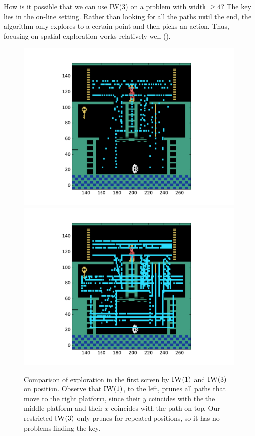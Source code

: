 How is it possible that we can use \ac{IW}(3) on a problem with width $\geq 4$?
The key lies in the on-line setting. Rather than looking for all the paths until
the end, the algorithm only explores to a certain point and then picks an
action. Thus, focusing on spatial exploration works relatively well
().
\begin{figure}[hbtp]
\begin{center}
\includegraphics[width=\textwidth / 2 -2cm]{img/iw1-explore-thick.pdf}
\includegraphics[width=\textwidth / 2 -2cm]{img/iw3-explore-thick.pdf}
\end{center}
\caption[Comparison of exploration in the first screen by $\textsc{IW}(1)$ and
$\textsc{IW}(3)$ on position.]
{Comparison of exploration in the first screen by $\textsc{IW}(1)$ and
$\textsc{IW}(3)$ on position. Observe that $\textsc{IW}(1)$, to the left, prunes
all paths that move to the right platform, since their $y$ coincides with the
the middle platform and their $x$ coincides with the path on top.
Our restricted $\textsc{IW}(3)$ only prunes for repeated positions, so it has no
problems finding the key.}
\label{fig:iw-1-3}
\end{figure}

